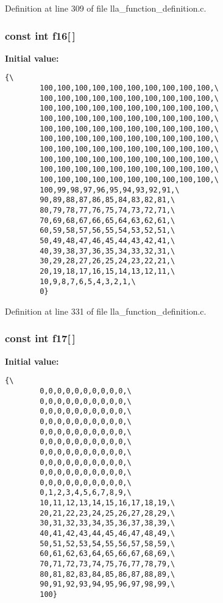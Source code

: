 Definition at line 309 of file lla\_\-function\_\-definition.c.
\subsubsection{\setlength{\rightskip}{0pt plus 5cm}const int {\bf f16}[$\,$]}\label{lla__function__definition_8c_a15}


{\bf Initial value:}

\footnotesize\begin{verbatim}{\
        100,100,100,100,100,100,100,100,100,100,\
        100,100,100,100,100,100,100,100,100,100,\
        100,100,100,100,100,100,100,100,100,100,\
        100,100,100,100,100,100,100,100,100,100,\
        100,100,100,100,100,100,100,100,100,100,\
        100,100,100,100,100,100,100,100,100,100,\
        100,100,100,100,100,100,100,100,100,100,\
        100,100,100,100,100,100,100,100,100,100,\
        100,100,100,100,100,100,100,100,100,100,\
        100,100,100,100,100,100,100,100,100,100,\
        100,99,98,97,96,95,94,93,92,91,\
        90,89,88,87,86,85,84,83,82,81,\
        80,79,78,77,76,75,74,73,72,71,\
        70,69,68,67,66,65,64,63,62,61,\
        60,59,58,57,56,55,54,53,52,51,\
        50,49,48,47,46,45,44,43,42,41,\
        40,39,38,37,36,35,34,33,32,31,\
        30,29,28,27,26,25,24,23,22,21,\
        20,19,18,17,16,15,14,13,12,11,\
        10,9,8,7,6,5,4,3,2,1,\
        0}
\end{verbatim}\normalsize 


Definition at line 331 of file lla\_\-function\_\-definition.c.
\subsubsection{\setlength{\rightskip}{0pt plus 5cm}const int {\bf f17}[$\,$]}\label{lla__function__definition_8c_a16}


{\bf Initial value:}

\footnotesize\begin{verbatim}{\
        0,0,0,0,0,0,0,0,0,0,\
        0,0,0,0,0,0,0,0,0,0,\
        0,0,0,0,0,0,0,0,0,0,\
        0,0,0,0,0,0,0,0,0,0,\
        0,0,0,0,0,0,0,0,0,0,\
        0,0,0,0,0,0,0,0,0,0,\
        0,0,0,0,0,0,0,0,0,0,\
        0,0,0,0,0,0,0,0,0,0,\
        0,0,0,0,0,0,0,0,0,0,\
        0,0,0,0,0,0,0,0,0,0,\
        0,1,2,3,4,5,6,7,8,9,\
        10,11,12,13,14,15,16,17,18,19,\
        20,21,22,23,24,25,26,27,28,29,\
        30,31,32,33,34,35,36,37,38,39,\
        40,41,42,43,44,45,46,47,48,49,\
        50,51,52,53,54,55,56,57,58,59,\
        60,61,62,63,64,65,66,67,68,69,\
        70,71,72,73,74,75,76,77,78,79,\
        80,81,82,83,84,85,86,87,88,89,\
        90,91,92,93,94,95,96,97,98,99,\
        100}
\end{verbatim}\normalsize 


